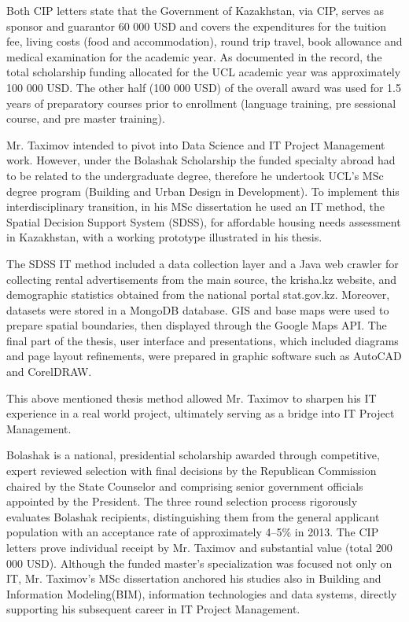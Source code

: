 Both CIP letters state that the Government of Kazakhstan, via CIP, serves as sponsor and guarantor 60 000 USD and covers the expenditures for the tuition fee, living costs (food and accommodation), round trip travel, book allowance and medical examination for the academic year. As documented in the record, the total scholarship funding allocated for the UCL academic year was approximately 100 000 USD. The other half (100 000 USD) of the overall award was used for 1.5 years of preparatory courses prior to enrollment (language training, pre sessional course, and pre master training).

Mr. Taximov intended to pivot into Data Science and IT Project Management work. However, under the Bolashak Scholarship the funded specialty abroad had to be related to the undergraduate degree, therefore he undertook UCL's MSc degree program (Building and Urban Design in Development). To implement this interdisciplinary transition, in his MSc dissertation he used an IT method, the Spatial Decision Support System (SDSS), for affordable housing needs assessment in Kazakhstan, with a working prototype illustrated in his thesis.

The SDSS IT method included a data collection layer and a Java web crawler for collecting rental advertisements from the main source, the krisha.kz website, and demographic statistics obtained from the national portal stat.gov.kz. Moreover, datasets were stored in a MongoDB database. GIS and base maps were used to prepare spatial boundaries, then displayed through the Google Maps API. The final part of the thesis, user interface and presentations, which included diagrams and page layout refinements, were prepared in graphic software such as AutoCAD and CorelDRAW.

This above mentioned thesis method allowed Mr. Taximov to sharpen his IT experience in a real world project, ultimately serving as a bridge into IT Project Management.

Bolashak is a national, presidential scholarship awarded through competitive, expert reviewed selection with final decisions by the Republican Commission chaired by the State Counselor and comprising senior government officials appointed by the President. The three round selection process rigorously evaluates Bolashak recipients, distinguishing them from the general applicant population with an acceptance rate of approximately 4--5\% in 2013. The CIP letters prove individual receipt by Mr. Taximov and substantial value (total 200 000 USD). Although the funded master's specialization was focused not only on IT, Mr. Taximov's MSc dissertation anchored his studies also in Building and Information Modeling(BIM), information technologies and data systems, directly supporting his subsequent career in IT Project Management. 

